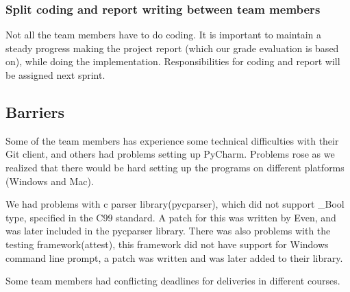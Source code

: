 \subsubsection{Split coding and report writing between team members} 
Not all the team members have to do coding. It is important to maintain a steady progress making the project report (which our grade evaluation is based on), while doing the implementation. Responsibilities for coding and report will be assigned next sprint. 

\subsection{Barriers}
Some of the team members has experience some technical difficulties with their Git client, and others had problems setting up PyCharm. Problems rose as we realized that there would be hard setting up the programs on different platforms (Windows and Mac).

We had problems with c parser library(pycparser), which did not support \_Bool type, specified in the C99 standard. A patch for this was written by Even, and was later included in the pycparser library. There was also problems with the testing framework(attest), this framework did not have support for Windows command line prompt, a patch was written and was later added to their library.

Some team members had conflicting deadlines for deliveries in different courses.

